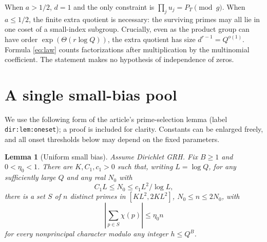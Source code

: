 \documentclass[11pt]{article}
\newtheorem{lemma}[theorem]{Lemma}
\theoremstyle{remark}\newtheorem{remark}[theorem]{Remark}
\newcommand{\abs}[1]{\left|#1\right|}
\begin{document}
When $a>1/2$, $d=1$ and the only constraint is $\prod_j u_j=P_T\pmod g$. When $a\le1/2$, the finite extra quotient is necessary: the surviving primes may all lie in one coset of a small-index subgroup. Crucially, even as the product group can have order $\exp(\Theta(r\log Q))$, the extra quotient has size $d^{r-1}=Q^{o(1)}$. Formula \eqref{eq:law} counts factorizations after multiplication by the multinomial coefficient. The statement makes no hypothesis of independence of zeros.

\section{A single small-bias pool}
We use the following form of the article's prime-selection lemma (label \texttt{dir:lem:oneset}); a proof is included for clarity. Constants can be enlarged freely, and all onset thresholds below may depend on the fixed parameters.
\begin{lemma}[Uniform small bias]\label{lem:pool}
Assume Dirichlet GRH. Fix $B\ge1$ and $0<\eta_0<1$. There are $K,C_1,c_1>0$ such that, writing $L=\log Q$, for any sufficiently large $Q$ and any real $N_0$ with
\[
 C_1L\le N_0\le c_1 L^2/\log L,
\]
there is a set $S$ of $n$ distinct primes in $[K L^2,2K L^2]$, $N_0\le n\le2N_0$, with
\[
\abs{\sum_{p\in S}\chi(p)}\le\eta_0n
\]
for every nonprincipal character modulo any integer $h\le Q^B$.
\end{lemma}
\end{document}
